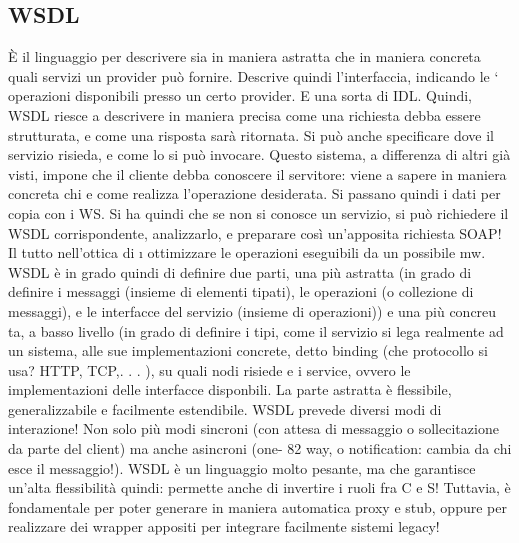 \subsection{WSDL}
È il linguaggio per descrivere sia in maniera astratta che in maniera concreta
quali servizi un provider può fornire. Descrive quindi l'interfaccia, indicando le
`
operazioni disponibili presso un certo provider. E una sorta di IDL. Quindi,
WSDL riesce a descrivere in maniera precisa come una richiesta debba essere
strutturata, e come una risposta sarà ritornata. Si può anche specificare dove il
servizio risieda, e come lo si può invocare.
Questo sistema, a differenza di altri già visti, impone che il cliente debba
conoscere il servitore: viene a sapere in maniera concreta chi e come realizza
l'operazione desiderata. Si passano quindi i dati per copia con i WS. Si ha quindi che se non si conosce un servizio, si
può richiedere il WSDL corrispondente,
analizzarlo, e preparare così un'apposita richiesta SOAP! Il tutto nell'ottica di
\i{}
ottimizzare le operazioni eseguibili da un possibile mw.
WSDL è in grado quindi di definire due parti, una più astratta (in grado
di definire i messaggi (insieme di elementi tipati), le operazioni (o collezione di
messaggi), e le interfacce del servizio (insieme di operazioni)) e una più concreu
ta, a basso livello (in grado di definire i tipi, come il servizio si lega realmente
ad un sistema, alle sue implementazioni concrete, detto binding (che protocollo
si usa? HTTP, TCP,. . . ), su quali nodi risiede e i service, ovvero le implementazioni delle interfacce disponbili. La
parte astratta è flessibile, generalizzabile
e facilmente estendibile.
WSDL prevede diversi modi di interazione! Non solo più modi sincroni (con
attesa di messaggio o sollecitazione da parte del client) ma anche asincroni (one-
82
way, o notification: cambia da chi esce il messaggio!).
WSDL è un linguaggio molto pesante, ma che garantisce un'alta flessibilità
quindi: permette anche di invertire i ruoli fra C e S! Tuttavia, è fondamentale
per poter generare in maniera automatica proxy e stub, oppure per realizzare
dei wrapper appositi per integrare facilmente sistemi legacy!
